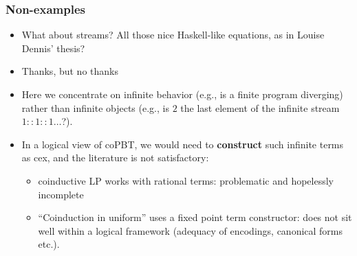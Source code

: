\documentclass{beamer}
\newcommand{\red}[1]{{\color{red} #1}}
\begin{document}
\begin{frame}
  \frametitle{\textbf{Non}-examples}
  \begin{itemize}
  \item What about \red{streams}? All those nice Haskell-like equations, as in Louise Dennis' thesis?
  \item Thanks, but no thanks
  \item Here we concentrate on \red{infinite behavior} (e.g.,
    is a finite program diverging) rather than \red{infinite objects}
    (e.g., is $2$ the last element of the infinite stream $1::1::1\dots$?).
  \item In a logical view of coPBT, we would need to
    \textbf{construct} such infinite terms as cex, and the literature is not satisfactory:
    \begin{itemize}
    \item coinductive LP works with rational terms: problematic and hopelessly incomplete
    \item ``Coinduction in uniform'' uses a fixed point term
      constructor: does not sit well within a logical framework
      (adequacy of encodings, canonical forms etc.).
    \end{itemize}
  \end{itemize}
\end{frame}



  
\end{document}
